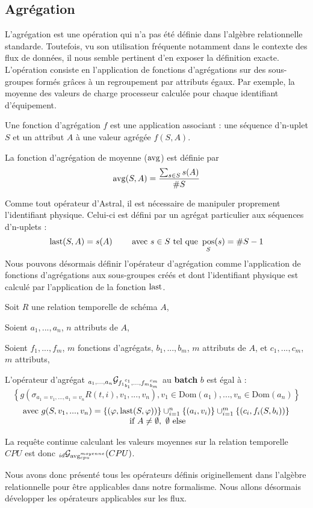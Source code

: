 \subsection{Agrégation}
L'agrégation est une opération qui n'a pas été définie dans l'algèbre relationnelle standarde. Toutefois, vu son utilisation fréquente notamment dans le contexte des flux de données, il nous semble pertinent d'en exposer la définition exacte. L'opération consiste en l'application de fonctions d'agrégations sur des sous-groupes formés grâces à un regroupement par attributs égaux. Par exemple, la moyenne des valeurs de charge processeur calculée pour chaque identifiant d'équipement. 
\begin{defi}
    Une fonction d'agrégation $f$ est une application associant : une séquence d'n-uplet $S$ et un attribut $A$ à une valeur agrégée $f(S,A)$.
\end{defi}
\begin{example}
    La fonction d'agrégation de moyenne ($\mathrm{avg}$) est définie par $$\mathrm{avg}(S,A) = \frac{\sum_{s\in S} s(A)}{\# S}$$
\end{example}

Comme tout opérateur d'Astral, il est nécessaire de manipuler proprement l'identifiant physique. Celui-ci est défini par un agrégat particulier aux séquences d'n-uplets : 
$$\mathrm{last}(S,A) = s(A) \qquad \textrm{ avec } s\in S \textrm{ tel que }\mathop{\mathrm{pos}}_{S}(s) = \#S-1$$
Nous pouvons désormais définir l'opérateur d'agrégation comme l'application de fonctions d'agrégations aux sous-groupes créés et dont l'identifiant physique est calculé par l'application de la fonction $\mathrm{last}$.
\begin{defi}
    Soit $R$ une relation temporelle de schéma $A$,

    Soient $a_1,...,a_n$, $n$ attributs de $A$,

    Soient $f_1,...,f_m$, $m$ fonctions d'agrégats, $b_1,...,b_m$, $m$ attributs de $A$, et $c_1,...,c_m$, $m$ attributs,

    L'opérateur d'agrégat $_{a_1,...,a_n}\mathcal{G}_{{f_1}_{b_1}^{c_1},...,{f_m}_{b_m}^{c_m}}$ au \textbf{batch} $b$ est égal à :
$$\left\{g(\sigma_{a_1=v_1,...,a_1=v_n} R(t,i),v_1,...,v_n), v_1 \in \mathrm{Dom}(a_1), ..., v_n \in \mathrm{Dom}(a_n)\right\} $$
$$\begin{array}{c}\textrm{avec } g(S,v_1,...,v_n) = \{(\varphi,\mathrm{last}(S,\varphi))\}\cup_{i=1}^n \{(a_i, v_i)\} \cup_{i=1}^m \{(c_i,f_i(S,b_i))\}\\ \textrm{ if } A \neq \emptyset,\ \emptyset\textrm{ else}\end{array}$$
\end{defi}

\begin{example}
    La requête continue calculant les valeurs moyennes sur la relation temporelle $CPU$ est donc $_{id}\mathcal{G}_{\mathrm{avg}_{cpu}^{moyenne}}(CPU)$.
\end{example}

Nous avons donc présenté tous les opérateurs définis originellement dans l'algèbre relationnelle pour être applicables dans notre formalisme. Nous allons désormais développer les opérateurs applicables sur les flux.
